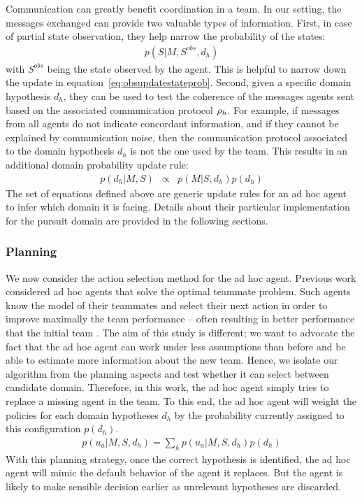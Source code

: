 Communication can greatly benefit coordination in a team. In our setting, the messages exchanged can provide two valuable types of information. First, in case of partial state observation, they help narrow the probability of the states:
%
\begin{eqnarray}
p(S|M, S^{obs}, d_h)
\label{eq:stateupdate}
\end{eqnarray}
%
with $S^{obs}$ being the state observed by the agent. This is helpful to narrow down the update in equation~\ref{eq:obsupdatestateprob}. Second, given a specific domain hypothesis $d_h$, they can be used to test the coherence of the messages agents sent based on the associated communication protocol $\rho_h$. For example, if messages from all agents do not indicate concordant information, and if they cannot be explained by communication noise, then the communication protocol associated to the domain hypothesis $d_h$ is not the one used by the team. This results in an additional domain probability update rule:
%
\begin{eqnarray}
p(d_h|M,S) &\propto& p(M|S,d_h) p(d_h)
\label{eq:messageupdate}
\end{eqnarray}
%
The set of equations defined above are generic update rules for an ad hoc agent to infer which domain it is facing. Details about their particular implementation for the pursuit domain are provided in the following sections.

\subsubsection{Planning}

We now consider the action selection method for the ad hoc agent. Previous work considered ad hoc agents that solve the optimal teammate problem. Such agents know the model of their teammates and select their next action in order to improve maximally the team performance -- often resulting in better performance that the initial team \cite{barrett2011empirical}. The aim of this study is different; we want to advocate the fact that the ad hoc agent can work under less assumptions than before and be able to estimate more information about the new team. Hence, we isolate our algorithm from the planning aspects and test whether it can select between candidate domain. Therefore, in this work, the ad hoc agent simply tries to replace a missing agent in the team. To this end, the ad hoc agent will weight the policies for each domain hypotheses $d_h$ by the probability currently assigned to this configuration $p(d_h)$.
%
\begin{eqnarray}
p(u_a|M, S,d_h) = \sum_h p(u_a|M, S, d_h) p(d_h)
\label{eq:adhocpolicy}
\end{eqnarray}
%
With this planning strategy, once the correct hypothesis is identified, the ad hoc agent will mimic the default behavior of the agent it replaces. But the agent is likely to make sensible decision earlier as unrelevant hypotheses are discarded.

